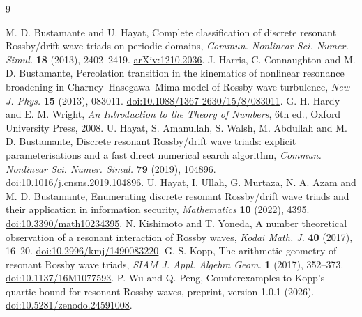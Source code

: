 \documentclass[11pt]{article}
\begin{document}
\begin{thebibliography}{9}
\raggedright
{} M. D. Bustamante and U. Hayat, Complete classification of discrete resonant Rossby/drift wave triads on periodic domains, \emph{Commun. Nonlinear Sci. Numer. Simul.} \textbf{18} (2013), 2402--2419. \href{https://arxiv.org/abs/1210.2036}{arXiv:1210.2036}.
 J. Harris, C. Connaughton and M. D. Bustamante, Percolation transition in the kinematics of nonlinear resonance broadening in Charney--Hasegawa--Mima model of Rossby wave turbulence, \emph{New J. Phys.} \textbf{15} (2013), 083011. \href{https://doi.org/10.1088/1367-2630/15/8/083011}{doi:10.1088/1367-2630/15/8/083011}.
 G. H. Hardy and E. M. Wright, \emph{An Introduction to the Theory of Numbers}, 6th ed., Oxford University Press, 2008.
 U. Hayat, S. Amanullah, S. Walsh, M. Abdullah and M. D. Bustamante, Discrete resonant Rossby/drift wave triads: explicit parameterisations and a fast direct numerical search algorithm, \emph{Commun. Nonlinear Sci. Numer. Simul.} \textbf{79} (2019), 104896. \href{https://doi.org/10.1016/j.cnsns.2019.104896}{doi:10.1016/j.cnsns.2019.104896}.
 U. Hayat, I. Ullah, G. Murtaza, N. A. Azam and M. D. Bustamante, Enumerating discrete resonant Rossby/drift wave triads and their application in information security, \emph{Mathematics} \textbf{10} (2022), 4395. \href{https://doi.org/10.3390/math10234395}{doi:10.3390/math10234395}.
 N. Kishimoto and T. Yoneda, A number theoretical observation of a resonant interaction of Rossby waves, \emph{Kodai Math. J.} \textbf{40} (2017), 16--20. \href{https://doi.org/10.2996/kmj/1490083220}{doi:10.2996/kmj/1490083220}.
 G. S. Kopp, The arithmetic geometry of resonant Rossby wave triads, \emph{SIAM J. Appl. Algebra Geom.} \textbf{1} (2017), 352--373. \href{https://doi.org/10.1137/16M1077593}{doi:10.1137/16M1077593}.
 P. Wu and Q. Peng, Counterexamples to Kopp's quartic bound for resonant Rossby waves, preprint, version 1.0.1 (2026). \href{https://doi.org/10.5281/zenodo.24591008}{doi:10.5281/zenodo.24591008}.
\end{thebibliography}
\end{document}
